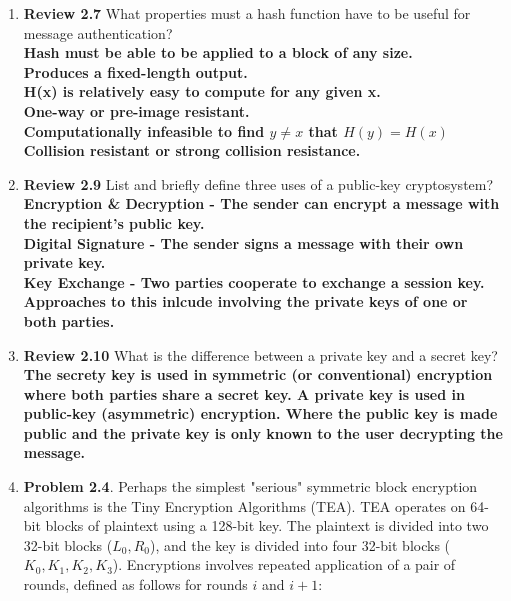 \documentclass[12pt]{article}
\begin{document}
\begin{enumerate}
\item {\textbf{Review 2.7} What properties must a hash function have to be useful for message authentication? } \\
\textbf{Hash must be able to be applied to a block of any size.}\\
\textbf{Produces a fixed-length output.}\\
\textbf{H(x) is relatively easy to compute for any given x.}\\
\textbf{One-way or pre-image resistant.}\\
\textbf{Computationally infeasible to find $y \neq x$ that $H(y) = H(x)$}\\
\textbf{Collision resistant or strong collision resistance.}\\
\vspace{10pt}
\item {\textbf{Review 2.9} List and briefly define three uses of a public-key cryptosystem? } \\
\textbf{Encryption \& Decryption - The sender can encrypt a message with the recipient's public key.} \\
\textbf{Digital Signature - The sender signs a message with their own private key.} \\
\textbf{Key Exchange - Two parties cooperate to exchange a session key. Approaches to this inlcude involving the private keys of one or both parties.} \\
\vspace{10pt}
\item {\textbf{Review 2.10} What is the difference between a private key and a secret key?} \\
\textbf{The secrety key is used in symmetric (or conventional) encryption where both parties share a secret key. A private key is used in public-key (asymmetric) encryption. Where the public key is made public and the private key is only known to the user decrypting the message.}
\vspace{10pt}
\item {\textbf{Problem 2.4}. Perhaps the simplest "serious" symmetric block encryption algorithms is the Tiny Encryption Algorithms (TEA). TEA operates on 64-bit blocks of plaintext using a 128-bit key. The plaintext is divided into two 32-bit blocks ($L_0,R_0$), and the key is divided into four 32-bit blocks ($K_0, K_1, K_2, K_3$). Encryptions involves repeated application of a pair of rounds, defined as follows for rounds $i$ and $i+1$:
\begin{center}

\end{center}}
\end{enumerate}
\end{document}
